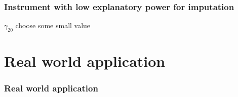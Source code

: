 \documentclass[aspectratio=1610]{beamer}
\begin{document}
\begin{frame}
	\frametitle{Instrument with low explanatory power for imputation}
	$\gamma_{20}$ choose some small value
\end{frame}
\begin{frame}
    
\end{frame}


\section{Real world application}

\begin{frame}
	\frametitle{Real world application}
    
\end{frame}
\end{document}
